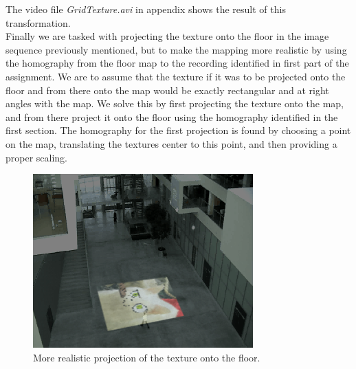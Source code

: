 The video file \textsl{GridTexture.avi} in appendix shows the result of this transformation. \\
Finally we are tasked with projecting the texture onto the floor in the image sequence previously mentioned, but to make the mapping more realistic by using the homography from the floor map to the recording identified in first part of the assignment. We are to assume that the texture if it was to be projected onto the floor and from there onto the map would be exactly rectangular and at right angles with the map. We solve this by first projecting the texture onto the map, and from there project it onto the floor using the homography identified in the first section. The homography for the first projection is found by choosing a point on the map, translating the textures center to this point, and then providing a proper scaling. 
\begin{figure}[h!]
	\centering
	\includegraphics[scale=1]{images/texture_projection.png}
	\caption{More realistic projection of the texture onto the floor.}
\end{figure}

